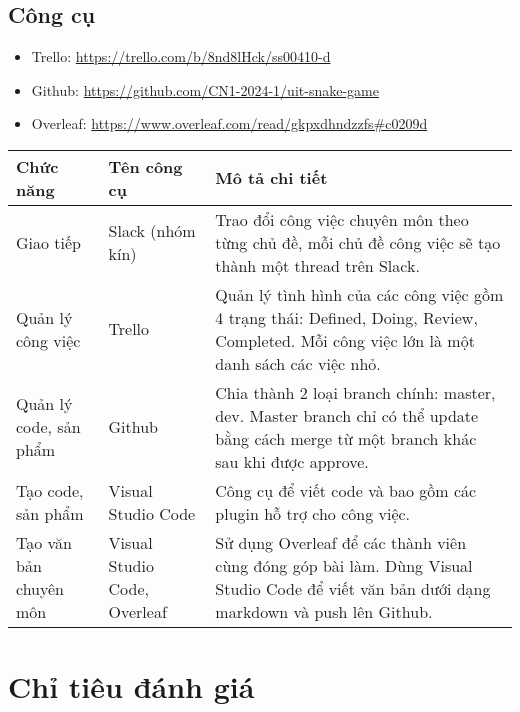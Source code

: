 \documentclass{article}
\begin{document}
\subsection{Công cụ}
\begin{itemize}
    \item Trello: \href{https://trello.com/b/8nd8lHck/ss00410-d}{https://trello.com/b/8nd8lHck/ss00410-d}
    \item Github: \href{https://github.com/CN1-2024-1/uit-snake-game}{https://github.com/CN1-2024-1/uit-snake-game}
    \item Overleaf: \href{https://www.overleaf.com/read/gkpxdhndzzfs#c0209d}{https://www.overleaf.com/read/gkpxdhndzzfs#c0209d}
\end{itemize}

\begin{tabularx}{\textwidth}{|X|X|X|}
\hline
\textbf{Chức năng} & \textbf{Tên công cụ} & \textbf{Mô tả chi tiết} \\
\hline
Giao tiếp & Slack (nhóm kín) & Trao đổi công việc chuyên môn theo từng chủ đề, mỗi chủ đề công việc sẽ tạo thành một thread trên Slack. \\
\hline
Quản lý công việc & Trello & Quản lý tình hình của các công việc gồm 4 trạng thái: Defined, Doing, Review, Completed. Mỗi công việc lớn là một danh sách các việc nhỏ. \\
\hline
Quản lý code, sản phẩm & Github & Chia thành 2 loại branch chính: master, dev. Master branch chỉ có thể update bằng cách merge từ một branch khác sau khi được approve. \\
\hline
Tạo code, sản phẩm & Visual Studio Code & Công cụ để viết code và bao gồm các plugin hỗ trợ cho công việc. \\
\hline
Tạo văn bản chuyên môn & Visual Studio Code, Overleaf & Sử dụng Overleaf để các thành viên cùng đóng góp bài làm. Dùng Visual Studio Code để viết văn bản dưới dạng markdown và push lên Github. \\
\hline
\end{tabularx}

\section{Chỉ tiêu đánh giá}
\end{document}
